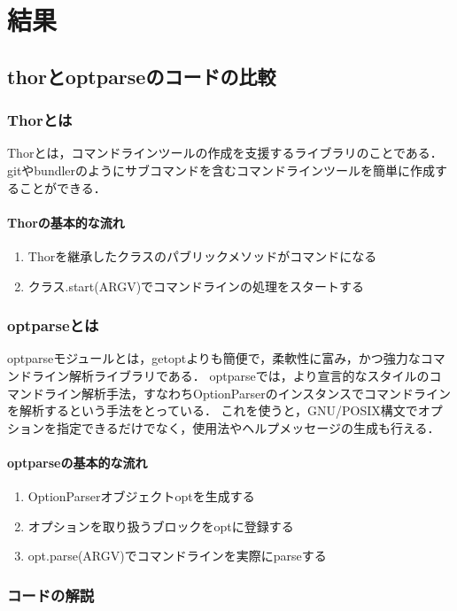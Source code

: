 \section{結果}
\subsection{thorとoptparseのコードの比較}
\subsubsection{Thorとは}
Thorとは，コマンドラインツールの作成を支援するライブラリのことである． gitやbundlerのようにサブコマンドを含むコマンドラインツールを簡単に作成することができる．

\paragraph{Thorの基本的な流れ}
\begin{enumerate}
\item Thorを継承したクラスのパブリックメソッドがコマンドになる
\item クラス.start(ARGV)でコマンドラインの処理をスタートする
\end{enumerate}
\subsubsection{optparseとは}
optparseモジュールとは，getoptよりも簡便で，柔軟性に富み，かつ強力なコマンドライン解析ライブラリである．
optparseでは，より宣言的なスタイルのコマンドライン解析手法，すなわちOptionParserのインスタンスでコマンドラインを解析するという手法をとっている．
これを使うと，GNU/POSIX構文でオプションを指定できるだけでなく，使用法やヘルプメッセージの生成も行える．

\paragraph{optparseの基本的な流れ}
\begin{enumerate}
\item OptionParserオブジェクトoptを生成する
\item オプションを取り扱うブロックをoptに登録する
\item opt.parse(ARGV)でコマンドラインを実際にparseする
\end{enumerate}
\subsubsection{コードの解説}
